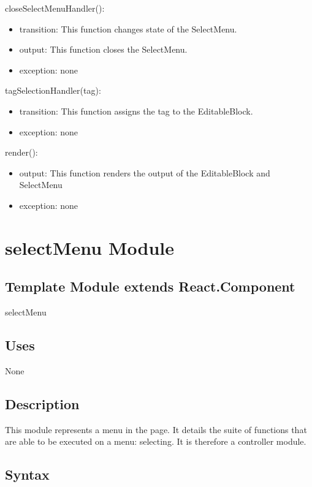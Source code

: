 \documentclass[12pt, titlepage]{article}
\begin{document}
\noindent closeSelectMenuHandler():
\begin{itemize}
\item transition: This function changes state of the SelectMenu. 
\item output: This function closes the SelectMenu.
\item exception: none
\end{itemize}

\noindent tagSelectionHandler(tag):
\begin{itemize}
\item transition: This function assigns the tag to the EditableBlock.
\item exception: none
\end{itemize}

\noindent render():
\begin{itemize}
\item output: This function renders the output of the EditableBlock and SelectMenu
\item exception: none
\end{itemize}

\newpage

\section{selectMenu Module}

\subsection{Template Module extends React.Component}

selectMenu

\subsection{Uses}

None

\subsection{Description}
This module represents a menu in the page. It details the suite of functions that are able to be executed on a menu: selecting. It is therefore a controller module.

\subsection{Syntax}
\end{document}
